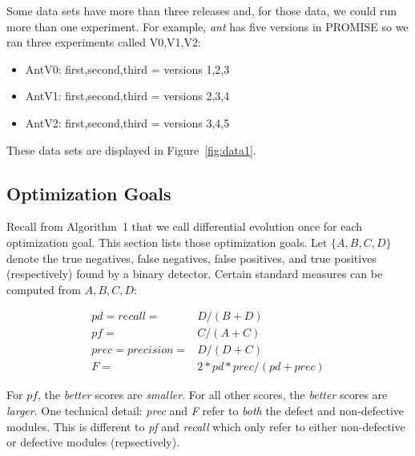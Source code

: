 \documentclass{sig-alternative}
\newcommand{\bi}{\begin{itemize}[leftmargin=0.4cm]}
\newcommand{\ei}{\end{itemize}}
\newcommand{\fig}[1]{Figure~\ref{fig:#1}}
\begin{document}
Some data sets have more than three releases and, for those data, we could run more
 than one experiment. For example, {\em ant} has five versions in PROMISE so
 we ran three experiments called V0,V1,V2:
 \bi
 \item AntV0: first,second,third = versions 1,2,3
 \item AntV1: first,second,third = versions 2,3,4
 \item AntV2: first,second,third = versions 3,4,5
 \ei 
These data sets are displayed in \fig{data1}.



\subsection{Optimization Goals}

Recall from Algorithm~1 that we call differential evolution once for each
 optimization goal. This section lists those optimization goals.
Let $\{A,B,C,D\}$ denote the
true negatives, 
false negatives, 
false positives, and 
true positives
(respectively) found by a binary detector. 
Certain standard measures can be computed from
$A,B,C,D$: 

{\scriptsize\[
\begin{array}{ll}
pd=recall=&D/(B+D)\\
pf=&C/(A+C)\\ 
prec=precision=&D/(D+C) \\
F =&2*pd*prec/(pd + prec)
\end{array}
\]}

For $pf$, the {\em better} scores are {\em smaller}.
For all other scores, the {\em better} scores are {\em larger}.
One technical detail:   {\em prec}
and {\em F} refer to {\em both} the defect and non-defective modules. This is different to {\em pf} and {\em recall} which only
refer to either non-defective or defective modules (repsectively).
\end{document}
